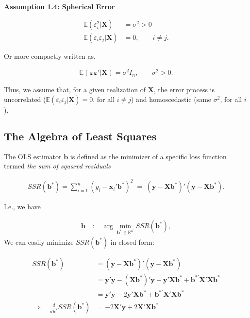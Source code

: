 \documentclass[
]{book}
\begin{document}
\textbf{Assumption 1.4: Spherical Error}

\begin{align*}
\mathbb{E}(\varepsilon_i^2|\mathbf{X}) &= \sigma^2>0\\
\mathbb{E}(\varepsilon_i\varepsilon_j|\mathbf{X}) &= 0,\quad\quad i\neq j.
\end{align*}

Or more compactly written as,

\begin{align*}
\mathbb{E}(\boldsymbol{\varepsilon}\boldsymbol{\varepsilon}'|\mathbf{X}) = \sigma^2 I_n,\quad\quad \sigma^2>0.
\end{align*}

Thus, we assume that, for a given realization of \(\mathbf{X}\), the error
process is uncorrelated (\(\mathbb{E}(\varepsilon_i\varepsilon_j|\mathbf{X})=0\), for all
\(i\neq j\)) and homoscedastic (same \(\sigma^2\), for all \(i\)).

\hypertarget{the-algebra-of-least-squares}{%
\subsection{The Algebra of Least Squares}\label{the-algebra-of-least-squares}}

The OLS estimator \(\mathbf{b}\) is defined as the minimizer of a specific loss
function termed \emph{the sum of squared residuals}

\begin{align*}
SSR(\mathbf{b}^\ast) = \sum_{i=1}^n(y_i-\mathbf{x}_i'\mathbf{b}^\ast)^2\;=\;(\mathbf{y}-\mathbf{X}\mathbf{b}^\ast)'(\mathbf{y}-\mathbf{X}\mathbf{b}^\ast).
\end{align*}

I.e., we have

\begin{align*}
  \mathbf{b}&:=\arg\min_{\mathbf{b}^\ast\in\mathbb{R}^K}SSR(\mathbf{b}^\ast),
\end{align*}
We can easily minimize \(SSR(\mathbf{b}^\ast)\) in closed form:

\begin{align*}
SSR(\mathbf{b}^\ast)
&= (\mathbf{y}-\mathbf{X}\mathbf{b}^\ast)'(\mathbf{y}-\mathbf{X}\mathbf{b}^\ast)\\
 &= \mathbf{y}'\mathbf{y}-(\mathbf{X}\mathbf{b}^{\ast})'\mathbf{y}-\mathbf{y}'\mathbf{X}\mathbf{b}^{\ast}+\mathbf{b}^{\ast'}\mathbf{X}'\mathbf{X}\mathbf{b}^{\ast}\\
    &= \mathbf{y}'\mathbf{y}-2\mathbf{y}'\mathbf{X}\mathbf{b}^{\ast}+\mathbf{b}^{\ast'}\mathbf{X}'\mathbf{X}\mathbf{b}^{\ast}\\[2ex]
   \Rightarrow\quad\frac{d}{d\mathbf{b}^{\ast}}SSR(\mathbf{b}^{\ast}) &= -2\mathbf{X}'\mathbf{y}+2\mathbf{X}'\mathbf{X}\mathbf{b}^{\ast}
\end{align*}
\end{document}
